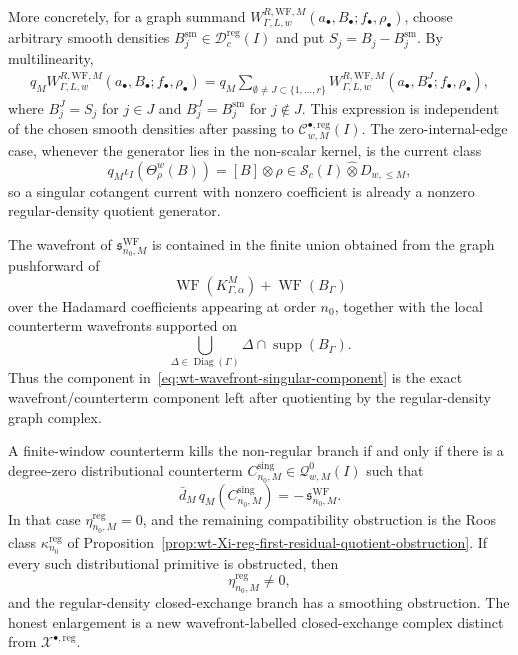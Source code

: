 \begin{thm}
  More concretely, for a graph summand
  \(W^{R,\mathrm{WF},M}_{\Gamma,L,w}
  (a_\bullet,B_\bullet;f_\bullet,\rho_\bullet)\), choose arbitrary smooth
  densities \(B_j^{\mathrm{sm}}\in\mathcal D^{\mathrm{reg}}_c(I)\) and put
  \(S_j=B_j-B_j^{\mathrm{sm}}\).  By multilinearity,
  \[
  \begin{aligned}
    q_M W^{R,\mathrm{WF},M}_{\Gamma,L,w}
      (a_\bullet,B_\bullet;f_\bullet,\rho_\bullet)
      =
    q_M\sum_{\emptyset\neq J\subset\{1,\ldots,r\}}
      W^{R,\mathrm{WF},M}_{\Gamma,L,w}
      (a_\bullet,B^J_\bullet;f_\bullet,\rho_\bullet),
  \end{aligned}
  \]
  where \(B^J_j=S_j\) for \(j\in J\) and
  \(B^J_j=B^{\mathrm{sm}}_j\) for \(j\notin J\).  This expression is
  independent of the chosen smooth densities after passing to
  \(\mathcal C^{\bullet,\mathrm{reg}}_{w,M}(I)\).  The zero-internal-edge
  case, whenever the generator lies in the non-scalar kernel, is the
  current class
  \[
    q_M\iota_I(\Theta^w_\rho(B))
      =
    [B]\otimes\rho
      \in
    \mathcal S_c(I)\widehat\otimes D_{w,\leq M},
  \]
  so a singular cotangent current with nonzero coefficient is already a
  nonzero regular-density quotient generator.

  The wavefront of \(\mathfrak s^{\mathrm{WF}}_{n_0,M}\) is contained in
  the finite union obtained from the graph pushforward of
  \[
    \operatorname{WF}(K^M_{\Gamma,\alpha})
      +\operatorname{WF}(B_\Gamma)
  \]
  over the Hadamard coefficients appearing at order \(n_0\), together with
  the local counterterm wavefronts supported on
  \[
    \bigcup_{\Delta\in\operatorname{Diag}(\Gamma)}
      \Delta\cap\operatorname{supp}(B_\Gamma).
  \]
  Thus the component in~\eqref{eq:wt-wavefront-singular-component} is the
  exact wavefront/counterterm component left after quotienting by the
  regular-density graph complex.

  A finite-window counterterm kills the non-regular branch if and only if
  there is a degree-zero distributional counterterm
  \(C^{\mathrm{sing}}_{n_0,M}\in\mathcal Q^0_{w,M}(I)\) such that
  \[
    \bar d_M\,q_M(C^{\mathrm{sing}}_{n_0,M})
      =
    -\,\mathfrak s^{\mathrm{WF}}_{n_0,M}.
  \]
  In that case
  \(\eta^{\mathrm{reg}}_{n_0,M}=0\), and the remaining compatibility
  obstruction is the Roos class
  \(\kappa^{\mathrm{reg}}_{n_0}\) of
  Proposition~\ref{prop:wt-Xi-reg-first-residual-quotient-obstruction}.
  If every such distributional primitive is obstructed, then
  \[
    \eta^{\mathrm{reg}}_{n_0,M}\neq0,
  \]
  and the regular-density closed-exchange branch has a smoothing
  obstruction.  The honest enlargement is a new wavefront-labelled
  closed-exchange complex distinct from
  \(\mathcal X^{\bullet,\mathrm{reg}}\).
\end{thm}

